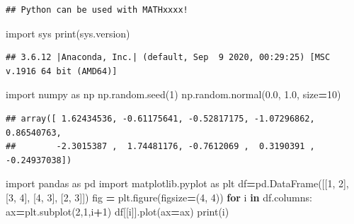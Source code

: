 \documentclass[mstat,12pt]{unswthesis}
\newenvironment{Shaded}{\begin{snugshade}}{\end{snugshade}}
\newcommand{\BuiltInTok}[1]{#1}
\newcommand{\ControlFlowTok}[1]{\textcolor[rgb]{0.13,0.29,0.53}{\textbf{#1}}}
\newcommand{\DecValTok}[1]{\textcolor[rgb]{0.00,0.00,0.81}{#1}}
\newcommand{\FloatTok}[1]{\textcolor[rgb]{0.00,0.00,0.81}{#1}}
\newcommand{\ImportTok}[1]{#1}
\newcommand{\KeywordTok}[1]{\textcolor[rgb]{0.13,0.29,0.53}{\textbf{#1}}}
\newcommand{\NormalTok}[1]{#1}
\newcommand{\OperatorTok}[1]{\textcolor[rgb]{0.81,0.36,0.00}{\textbf{#1}}}
\begin{document}
\begin{verbatim}
## Python can be used with MATHxxxx!
\end{verbatim}

\begin{Shaded}
\begin{Highlighting}[]
\ImportTok{import}\NormalTok{ sys}
\BuiltInTok{print}\NormalTok{(sys.version)}
\end{Highlighting}
\end{Shaded}

\begin{verbatim}
## 3.6.12 |Anaconda, Inc.| (default, Sep  9 2020, 00:29:25) [MSC v.1916 64 bit (AMD64)]
\end{verbatim}

\begin{Shaded}
\begin{Highlighting}[]
\ImportTok{import}\NormalTok{ numpy }\ImportTok{as}\NormalTok{ np}
\NormalTok{np.random.seed(}\DecValTok{1}\NormalTok{)}
\NormalTok{np.random.normal(}\FloatTok{0.0}\NormalTok{, }\FloatTok{1.0}\NormalTok{, size}\OperatorTok{=}\DecValTok{10}\NormalTok{)}
\end{Highlighting}
\end{Shaded}

\begin{verbatim}
## array([ 1.62434536, -0.61175641, -0.52817175, -1.07296862,  0.86540763,
##        -2.3015387 ,  1.74481176, -0.7612069 ,  0.3190391 , -0.24937038])
\end{verbatim}

\begin{Shaded}
\begin{Highlighting}[]
\ImportTok{import}\NormalTok{ pandas }\ImportTok{as}\NormalTok{ pd}
\ImportTok{import}\NormalTok{ matplotlib.pyplot }\ImportTok{as}\NormalTok{ plt}
\NormalTok{df}\OperatorTok{=}\NormalTok{pd.DataFrame([[}\DecValTok{1}\NormalTok{, }\DecValTok{2}\NormalTok{], [}\DecValTok{3}\NormalTok{, }\DecValTok{4}\NormalTok{], [}\DecValTok{4}\NormalTok{, }\DecValTok{3}\NormalTok{], [}\DecValTok{2}\NormalTok{, }\DecValTok{3}\NormalTok{]])}
\NormalTok{fig }\OperatorTok{=}\NormalTok{ plt.figure(figsize}\OperatorTok{=}\NormalTok{(}\DecValTok{4}\NormalTok{, }\DecValTok{4}\NormalTok{))}
\ControlFlowTok{for}\NormalTok{ i }\KeywordTok{in}\NormalTok{ df.columns:}
\NormalTok{    ax}\OperatorTok{=}\NormalTok{plt.subplot(}\DecValTok{2}\NormalTok{,}\DecValTok{1}\NormalTok{,i}\OperatorTok{+}\DecValTok{1}\NormalTok{) }
\NormalTok{    df[[i]].plot(ax}\OperatorTok{=}\NormalTok{ax)}
    \BuiltInTok{print}\NormalTok{(i)}
\end{Highlighting}
\end{Shaded}
\end{document}
